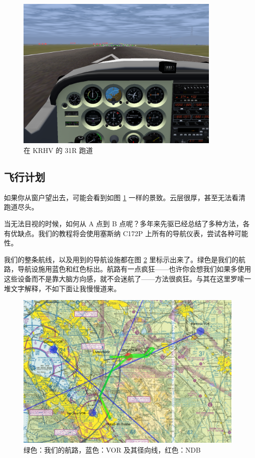 \begin{figure}
  \begin{center}
    \includegraphics[width=10cm]{img/KRHV}
    \caption{在 KRHV 的 31R 跑道}
    \label{fig:KRHV}
  \end{center}
\end{figure}

\subsection{飞行计划}

如果你从窗户望出去，可能会看到如图 \ref{fig:KRHV} 一样的景致。云层很厚，甚至无法看清跑道尽头。

当无法目视的时候，如何从 A 点到 B 点呢？多年来先驱已经总结了多种方法，各有优缺点。我们的教程将会使用塞斯纳 C172P 上所有的导航仪表，尝试各种可能性。

我们的整条航线，以及用到的导航设施都在图 \ref{fig:sectional_labelled} 里标示出来了。绿色是我们的航路，导航设施用蓝色和红色标出。航路有一点疯狂——也许你会想我们如果多使用这些设备而不是靠大脑方向感，就不会迷航了——方法很疯狂。与其在这里罗嗦一堆文字解释，不如下面让我慢慢道来。

\begin{figure}
  \begin{center}
    \includegraphics[width=20cm, angle=-90]{img/sectional_labelled}
    \caption{绿色：我们的航路，蓝色：VOR 及其径向线，红色：NDB}
    \label{fig:sectional_labelled}
  \end{center}
\end{figure}

